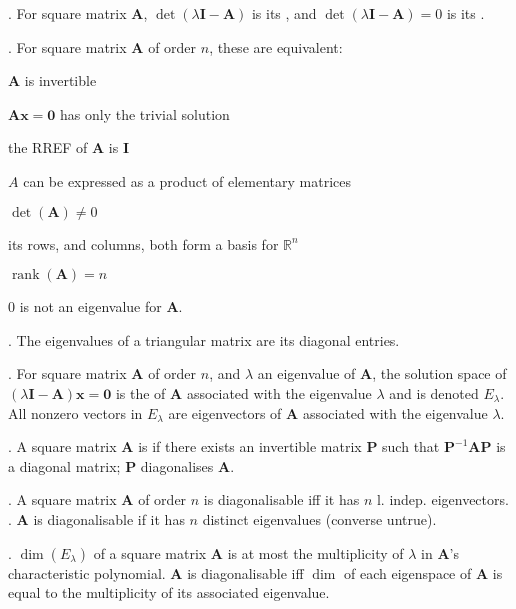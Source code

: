 \documentclass{slnotes}
\DeclareMathOperator*{\rank}{rank}
\begin{document}
. For square matrix \(\mathbf A\), \(\det(\lambda\mathbf I - \mathbf A)\) is its , and \(\det(\lambda\mathbf I - \mathbf A) = 0\) is its .

. For square matrix \(\mathbf A\) of order \(n\), these are equivalent:
\begin{slinenum}
\item \(\mathbf A\) is invertible
\item \(\mathbf{Ax} = \mathbf{0}\) has only the trivial solution
\item the RREF of \(\mathbf A\) is \(\mathbf I\)
\item \(A\) can be expressed as a product of elementary matrices
\item \(\det(\mathbf A) \ne 0\)
\item its rows, and columns, both form a basis for \(\mathbb{R}^n\)
\item \(\rank(\mathbf A) = n\)
\item \(0\) is not an eigenvalue for \(\mathbf A\).
\end{slinenum}

. The eigenvalues of a triangular matrix are its diagonal entries.

. For square matrix \(\mathbf A\) of order \(n\), and \(\lambda\) an eigenvalue of \(\mathbf A\), the solution space of \((\lambda\mathbf I - \mathbf A)\mathbf x = \mathbf 0\) is the  of \(\mathbf A\) associated with the eigenvalue \(\lambda\) and is denoted \(E_\lambda\). All nonzero vectors in \(E_\lambda\) are eigenvectors of \(\mathbf A\) associated with the eigenvalue \(\lambda\).

. A square matrix \(\mathbf A\) is  if there exists an invertible matrix \(\mathbf P\) such that \(\mathbf P^{-1}\mathbf{AP}\) is a diagonal matrix; \(\mathbf P\) diagonalises \(\mathbf A\).

. A square matrix \(\mathbf A\) of order \(n\) is diagonalisable iff it has \(n\) l. indep. eigenvectors. . \(\mathbf A\) is diagonalisable if it has \(n\) distinct eigenvalues (converse untrue).

. \(\dim(E_\lambda)\) of a square matrix \(\mathbf A\) is at most the multiplicity of \(\lambda\) in \(\mathbf{A}\)'s characteristic polynomial. \(\mathbf A\) is diagonalisable iff \(\dim\) of each eigenspace of \(\mathbf A\) is equal to the multiplicity of its associated eigenvalue.
\end{document}
